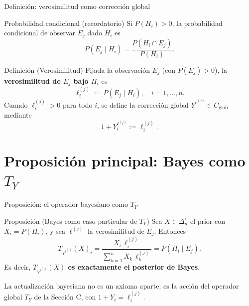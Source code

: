 \documentclass[12pt, aspectratio=169]{beamer}
\newcommand{\Dni}{\Delta_n^\circ}
\newcommand{\Glob}{C_{\mathrm{glob}}}
\begin{document}
\begin{frame}{Definición: verosimilitud como corrección global}

  \begin{block}{Probabilidad condicional (recordatorio)}
    Si $P(H_i) > 0$, la probabilidad condicional de observar $E_j$ dado $H_i$ es
    \[
      P(E_j \mid H_i) = \frac{P(H_i \cap E_j)}{P(H_i)}.
    \]
  \end{block}

  \begin{block}{Definición (Verosimilitud)}
    Fijada la observación $E_j$ (con $P(E_j) > 0$), la
    \textbf{verosimilitud de $E_j$ bajo $H_i$} es
    \[
      \ell_i^{(j)} := P(E_j \mid H_i), \quad i = 1, \dots, n.
    \]
    Cuando $\ell_i^{(j)} > 0$ para todo $i$, se define la corrección global
    $Y^{\ell^{(j)}} \in \Glob$ mediante
    \[
      1 + Y_i^{\ell^{(j)}} := \ell_i^{(j)}.
    \]
  \end{block}
\end{frame}

\section{Proposición principal: Bayes como $T_Y$}

\begin{frame}{Proposición: el operador bayesiano como $T_Y$}

  \begin{alertblock}{Proposición (Bayes como caso particular de $T_Y$)}
    Sea $X \in \Dni$ el prior con $X_i = P(H_i)$, y sea $\ell^{(j)}$
    la verosimilitud de $E_j$. Entonces
    \[
      T_{Y^{\ell^{(j)}}}(X)_i
      = \frac{X_i \, \ell_i^{(j)}}{\displaystyle\sum_{k=1}^n X_k \, \ell_k^{(j)}}
      = P(H_i \mid E_j).
    \]
    Es decir, \textbf{$T_{Y^{\ell^{(j)}}}(X)$ es exactamente el posterior de Bayes}.
  \end{alertblock}

  \vspace{4pt}
  \small La actualización bayesiana no es un axioma aparte: es la acción
  del operador global $T_Y$ de la Sección C, con $1 + Y_i = \ell_i^{(j)}$.
\end{frame}
\end{document}
